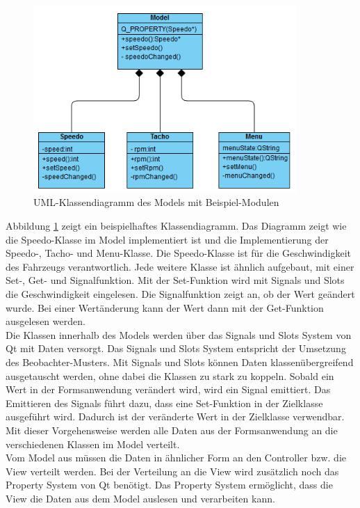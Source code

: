 \begin{figure}[htb]
	\centering
	\includegraphics[width=10cm]{img/5_implementierung/implement_model}
	\caption[UML-Klassendiagramm des Models]{UML-Klassendiagramm des Models mit Beispiel-Modulen}
	\label{fig:implement_model}
\end{figure}

Abbildung \ref{fig:implement_model} zeigt ein beispielhaftes Klassendiagramm. Das Diagramm zeigt wie die Speedo-Klasse im Model implementiert ist und die Implementierung der Speedo-, Tacho- und Menu-Klasse. Die Speedo-Klasse ist für die Geschwindigkeit des Fahrzeugs verantwortlich. Jede weitere Klasse ist ähnlich aufgebaut, mit einer Set-, Get- und Signalfunktion. Mit der Set-Funktion wird mit Signals und Slots die Geschwindigkeit eingelesen. Die Signalfunktion zeigt an, ob der Wert geändert wurde. Bei einer Wertänderung kann der Wert dann mit der Get-Funktion ausgelesen werden.\\

Die Klassen innerhalb des Models werden über das Signals und Slots System von Qt mit Daten versorgt. Das Signals und Slots System entspricht der Umsetzung des Beobachter-Musters. Mit Signals und Slots können Daten klassenübergreifend ausgetauscht werden, ohne dabei die Klassen zu stark zu koppeln. Sobald ein Wert in der Formsanwendung verändert wird, wird ein Signal emittiert. Das Emittieren des Signals führt dazu, dass eine Set-Funktion in der Zielklasse ausgeführt wird. Dadurch ist der veränderte Wert in der Zielklasse verwendbar. Mit dieser Vorgehensweise werden alle Daten aus der Formsanwendung an die verschiedenen Klassen im Model verteilt.\\

Vom Model aus müssen die Daten in ähnlicher Form an den Controller bzw. die View verteilt werden. Bei der Verteilung an die View wird zusätzlich noch das Property System von Qt benötigt. Das Property System ermöglicht, dass die View die Daten aus dem Model auslesen und verarbeiten kann. %

